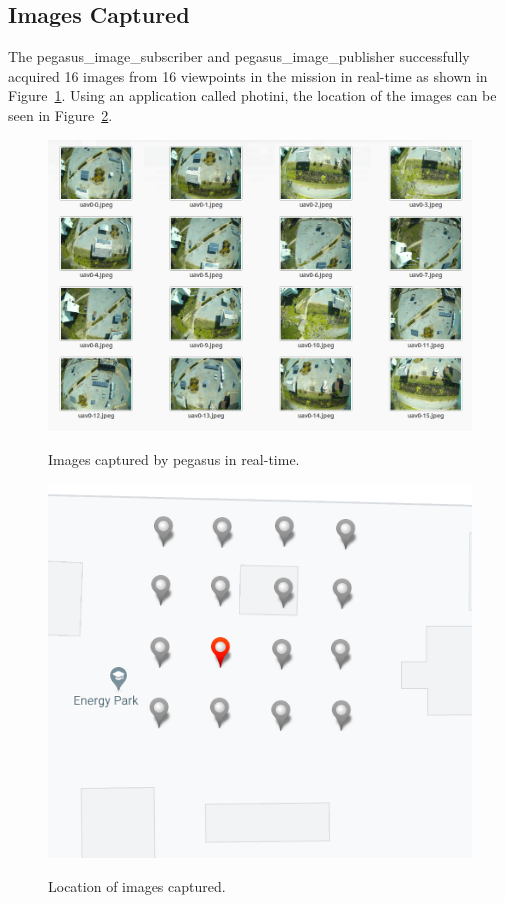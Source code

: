 \subsection{Images Captured}

The pegasus\_image\_subscriber and pegasus\_image\_publisher successfully acquired 16 images from 16 viewpoints in the mission in real-time as shown in Figure~\ref{fig:real-images}. Using an application called photini, the location of the images can be seen in Figure~\ref{fig:exif-real-images}. 
\begin{figure}
	\centering
	\caption[Images captured by pegasus in real-time.]{\small Images captured by pegasus in real-time.} 
	\includegraphics[width=6in]{figures/experiment/real-images}
	\label{fig:real-images}
\end{figure}

\begin{figure}
	\centering
	\caption[Location of images captured.]{\small Location of images captured.} 
	\includegraphics[width=5in]{figures/experiment/real-images-exif-tag}
	\label{fig:exif-real-images}
\end{figure}

